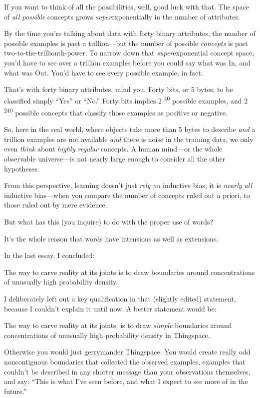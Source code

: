 {
 If you want to think of all the possibilities, well, good luck
with that. The space of \textit{all possible} concepts grows
\textit{super}exponentially in the number of attributes.}

{
 By the time you're talking about data with forty
binary attributes, the number of possible examples is past a
trillion---but the number of possible \textit{concepts} is past
two-to-the-trillionth-power. To narrow down that
\textit{super}exponential concept space, you'd have to
see over a trillion examples before you could say what was In, and what
was Out. You'd have to see every possible example, in
fact.}

{
 That's with forty binary attributes, mind you.
Forty bits, or 5 bytes, to be classified simply
``Yes'' or
``No.'' Forty bits implies
2\textsuperscript{ 40} possible examples, and 2\textsuperscript{ 240}
possible concepts that classify those examples as positive or
negative.}

{
 So, here in the real world, where objects take more than 5 bytes
to describe \textit{and} a trillion examples are not available
\textit{and} there is noise in the training data, we only even
\textit{think} about \textit{highly regular} concepts. A human
mind---or the whole observable universe---is not nearly large enough to
consider all the other hypotheses.}

{
 From this perspective, learning doesn't just
\textit{rely on} inductive bias, it is \textit{nearly all} inductive
bias---when you compare the number of concepts ruled out a priori, to
those ruled out by mere evidence.}

{
 But what has this (you inquire) to do with the proper use of
words?}

{
 It's the whole reason that words have intensions
as well as extensions.}

{
 In the last essay, I concluded:}

{
 The way to carve reality at its joints is to draw boundaries
around concentrations of unusually high probability density.}

{
 I deliberately left out a key qualification in that (slightly
edited) statement, because I couldn't explain it until
now. A better statement would be:}

{
 The way to carve reality at its joints, is to draw \textit{simple}
boundaries around concentrations of unusually high probability density
in Thingspace.}

{
 Otherwise you would just gerrymander Thingspace. You would create
really odd noncontiguous boundaries that collected the observed
examples, examples that couldn't be described in any
shorter message than your observations themselves, and say:
``This is what I've seen before, and
what I expect to see more of in the future.''}

